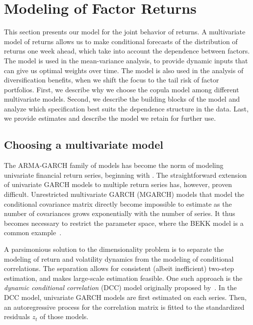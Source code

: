 
\section{Modeling of Factor Returns} %
\label{sec:modeling_of_factor_returns}




This section presents our model for the joint behavior of returns. A multivariate model of returns allows us to make conditional forecasts of the distribution of returns one week ahead, which take into account the dependence between factors. The model is used in the mean-variance analysis, to provide dynamic inputs that can give us optimal weights over time. The model is also used in the analysis of diversification benefits, when we shift the focus to the tail risk of factor portfolios. First, we describe why we choose the copula model among different multivariate models. Second, we describe the building blocks of the model and analyze which specification best suits the dependence structure in the data. Last, we provide estimates and describe the model we retain for further use.

\subsection{Choosing a multivariate model}
The ARMA-GARCH family of models has become the norm of modeling univariate financial return series, beginning with \textcite{Bollerslev1986}. The straightforward extension of univariate GARCH models to multiple return series has, however, proven difficult. Unrestricted multivariate GARCH (MGARCH) models that model the conditional covariance matrix directly become impossible to estimate as the number of covariances grows exponentially with the number of series. It thus becomes necessary to restrict the parameter space, where the BEKK model is a common example~\autocite{BEKKModel}.

A parsimonious solution to the dimensionality problem is to separate the modeling of return and volatility dynamics from the modeling of conditional correlations. The separation allows for consistent (albeit inefficient) two-step estimation, and makes large-scale estimation feasible. One such approach is the \emph{dynamic conditional correlation} (DCC) model originally proposed by~\autocite{Engle2002}. In the DCC model, univariate GARCH models are first estimated on each series. Then, an autoregressive process for the correlation matrix is fitted to the standardized residuals ${z_t}$ of those models. 

